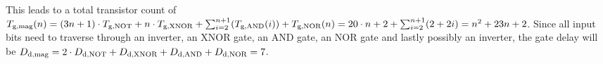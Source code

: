 \begin{itemize}
    This leads to a total transistor count of $\f{T}{g}{mag}(n) = (3n + 1) \cdot \f{T}{g}{NOT} + n \cdot \f{T}{g}{XNOR} + \sum_{i = 2}^{n + 1}(\f{T}{g}{AND}(i)) + \f{T}{g}{NOR}(n) = 20 \cdot n + 2 + \sum_{i = 2}^{n + 1}(2 + 2i) = n^{2} + 23n + 2$. Since all input bits need to traverse through an inverter, an XNOR gate, an AND gate, an NOR gate and lastly possibly an inverter, the gate delay will be $\f{D}{d}{mag} = 2 \cdot \f{D}{d}{NOT} + \f{D}{d}{XNOR} + \f{D}{d}{AND} + \f{D}{d}{NOR} = 7$.
\end{itemize}
\newcommand{\eqln}[9]{#1
  &          $\begin{aligned}&\f{T}{g}{#1}#2 = #3\end{aligned}$
  &\ifnn{#5} $\begin{aligned}&\f{T}{t}{#1}#4 = #5\end{aligned}$ \fi
  &          $\begin{aligned}&\f{D}{d}{#1}#6 = #7\end{aligned}$
  &\ifnn{#9} $\begin{aligned}&\f{D}{c}{#1}#8 = #9\end{aligned}$ \fi
  \\\hline
}
